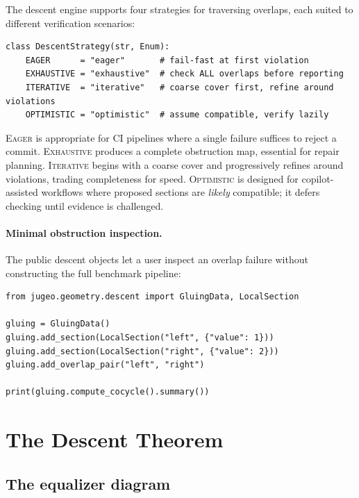 \documentclass[11pt]{article}
\begin{document}
The \JuGeo{} descent engine supports four strategies for traversing overlaps,
each suited to different verification scenarios:

\begin{lstlisting}[caption={Descent strategies.},label={lst:descent-strategy}]
class DescentStrategy(str, Enum):
    EAGER      = "eager"       # fail-fast at first violation
    EXHAUSTIVE = "exhaustive"  # check ALL overlaps before reporting
    ITERATIVE  = "iterative"   # coarse cover first, refine around violations
    OPTIMISTIC = "optimistic"  # assume compatible, verify lazily
\end{lstlisting}

\noindent
\textsc{Eager} is appropriate for CI pipelines where a single failure
suffices to reject a commit.  \textsc{Exhaustive} produces a complete
obstruction map, essential for repair planning.  \textsc{Iterative} begins
with a coarse cover and progressively refines around violations, trading
completeness for speed.  \textsc{Optimistic} is designed for copilot-assisted
workflows where proposed sections are \emph{likely} compatible; it defers
checking until evidence is challenged.

\paragraph{Minimal obstruction inspection.}
The public descent objects let a user inspect an overlap failure without
constructing the full benchmark pipeline:

\begin{lstlisting}[style=jugeo-python,caption={Computing a cocycle from two incompatible local sections.}]
from jugeo.geometry.descent import GluingData, LocalSection

gluing = GluingData()
gluing.add_section(LocalSection("left", {"value": 1}))
gluing.add_section(LocalSection("right", {"value": 2}))
gluing.add_overlap_pair("left", "right")

print(gluing.compute_cocycle().summary())
\end{lstlisting}


\section{The Descent Theorem}\label{sec:descent}

\subsection{The equalizer diagram}
\end{document}
